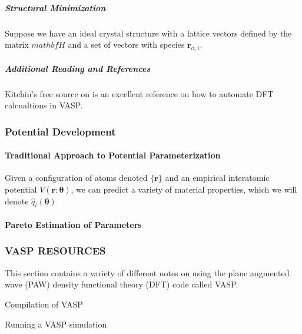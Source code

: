 \documentclass[letterpaper,10pt,english]{sphinxmanual}
\begin{document}
\subparagraph{Structural Minimization}
\label{\detokenize{calc_material_properties/index:structural-minimization}}
Suppose we have an ideal crystal structure with a lattice vectors defined by the matrix \(mathbf{H}\) and a set of vectors with species \(\mathbf{r}_{\alpha,i}\).


\subparagraph{Additional Reading and References}
\label{\detokenize{calc_material_properties/index:additional-reading-and-references}}
Kitchin’s free source on  is an excellent reference on how to automate DFT calcualtions in VASP.


\subsubsection{Potential Development}
\label{\detokenize{pot_dev/index:potential-development}}\label{\detokenize{pot_dev/index::doc}}

\paragraph{Traditional Approach to Potential Parameterization}
\label{\detokenize{pot_dev/param_trad:traditional-approach-to-potential-parameterization}}\label{\detokenize{pot_dev/param_trad::doc}}
Given a configuration of atoms denoted \(\{\mathbf{r}\}\) and an empirical interatomic potential \(V(\mathbf{r}:\mathbf{\theta})\), we can predict a variety of material properties, which we will denote \(\hat{q}_i(\mathbf{\theta})\)


\paragraph{Pareto Estimation of Parameters}
\label{\detokenize{pot_dev/param_pareto:pareto-estimation-of-parameters}}\label{\detokenize{pot_dev/param_pareto::doc}}

\subsubsection{VASP RESOURCES}
\label{\detokenize{vasp/index:vasp-resources}}\label{\detokenize{vasp/index::doc}}
This section contains a variety of different notes on using the plane augmented wave (PAW) density functional theory (DFT) code called VASP.

Compilation of VASP

Running a VASP simulation
\end{document}
